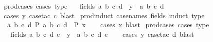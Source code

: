 \begin{isabellebody}
{\isafoldproof}%
%
\isadelimproof
\isanewline
%
\endisadelimproof
\isanewline
{}\isamarkupfalse%
\ prod{\isacharunderscore}{\kern0pt}cases{}\ {\isacharbrackleft}{\kern0pt}cases\ type{\isacharbrackright}{\kern0pt}{\isacharcolon}{\kern0pt}\isanewline
\ \ \ {\isacharparenleft}{\kern0pt}fields{\isacharparenright}{\kern0pt}\ a\ b\ c\ d\ \ {\isachardoublequoteopen}y\ {\isacharequal}{\kern0pt}\ {\isacharparenleft}{\kern0pt}a{\isacharcomma}{\kern0pt}\ b{\isacharcomma}{\kern0pt}\ c{\isacharcomma}{\kern0pt}\ d{\isacharparenright}{\kern0pt}{\isachardoublequoteclose}\isanewline
%
\isadelimproof
\ \ %
\endisadelimproof
%
\isatagproof
{}\isamarkupfalse%
\ {\isacharparenleft}{\kern0pt}cases\ y{\isacharcomma}{\kern0pt}\ case{\isacharunderscore}{\kern0pt}tac\ c{\isacharparenright}{\kern0pt}\ blast%
\endisatagproof
{\isafoldproof}%
%
\isadelimproof
\isanewline
%
\endisadelimproof
\isanewline
{}\isamarkupfalse%
\ prod{\isacharunderscore}{\kern0pt}induct{}\ {\isacharbrackleft}{\kern0pt}case{\isacharunderscore}{\kern0pt}names\ fields{\isacharcomma}{\kern0pt}\ induct\ type{\isacharbrackright}{\kern0pt}{\isacharcolon}{\kern0pt}\isanewline
\ \ {\isachardoublequoteopen}{\isacharparenleft}{\kern0pt}{\isasymAnd}a\ b\ c\ d{\isachardot}{\kern0pt}\ P\ {\isacharparenleft}{\kern0pt}a{\isacharcomma}{\kern0pt}\ b{\isacharcomma}{\kern0pt}\ c{\isacharcomma}{\kern0pt}\ d{\isacharparenright}{\kern0pt}{\isacharparenright}{\kern0pt}\ {\isasymLongrightarrow}\ P\ x{\isachardoublequoteclose}\isanewline
%
\isadelimproof
\ \ %
\endisadelimproof
%
\isatagproof
{}\isamarkupfalse%
\ {\isacharparenleft}{\kern0pt}cases\ x{\isacharparenright}{\kern0pt}\ blast%
\endisatagproof
{\isafoldproof}%
%
\isadelimproof
\isanewline
%
\endisadelimproof
\isanewline
{}\isamarkupfalse%
\ prod{\isacharunderscore}{\kern0pt}cases{}\ {\isacharbrackleft}{\kern0pt}cases\ type{\isacharbrackright}{\kern0pt}{\isacharcolon}{\kern0pt}\isanewline
\ \ \ {\isacharparenleft}{\kern0pt}fields{\isacharparenright}{\kern0pt}\ a\ b\ c\ d\ e\ \ {\isachardoublequoteopen}y\ {\isacharequal}{\kern0pt}\ {\isacharparenleft}{\kern0pt}a{\isacharcomma}{\kern0pt}\ b{\isacharcomma}{\kern0pt}\ c{\isacharcomma}{\kern0pt}\ d{\isacharcomma}{\kern0pt}\ e{\isacharparenright}{\kern0pt}{\isachardoublequoteclose}\isanewline
%
\isadelimproof
\ \ %
\endisadelimproof
%
\isatagproof
{}\isamarkupfalse%
\ {\isacharparenleft}{\kern0pt}cases\ y{\isacharcomma}{\kern0pt}\ case{\isacharunderscore}{\kern0pt}tac\ d{\isacharparenright}{\kern0pt}\ blast%

\end{isabellebody}
